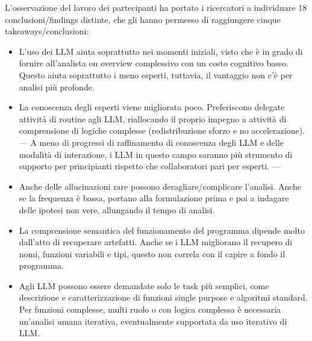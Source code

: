 L'osservazione del lavoro dei partecipanti ha portato i ricercatori a individuare 18 conclusioni/findings distinte, che gli hanno permesso di raggiungere cinque takeaways/conclusioni:

\begin{itemize}
    \item L'uso dei LLM aiuta soprattutto nei momenti iniziali, visto che è in grado di fornire all'analista on overview complessivo con un costo cognitivo basso. Questo aiuta soprattutto i meno esperti, tuttavia, il vantaggio non c'è per analisi più profonde.
    \item La conoscenza degli esperti viene migliorata poco. Preferiscono delegate attività di routine agli LLM, riallocando il proprio impegno a attività di comprensione di logiche complesse (redistribuzione sforzo e no accelerazione). --- A meno di progressi di raffinamento di conoscenza degli LLM e delle modalità di interazione, i LLM in questo campo saranno più strumento di supporto per principianti rispetto che collaboratori pari per esperti. ---
    \item Anche delle allucinazioni rare possono deragliare/complicare l'analisi. Anche se la frequenza è bassa, portano alla formulazione prima e poi a indagare delle ipotesi non vere, allungando il tempo di analisi.
    \item La comprensione semantica del funzionamento del programma dipende molto dall'atto di recuperare artefatti. Anche se i LLM migliorano il recupero di nomi, funzioni variabili e tipi, questo non correla con il capire a fondo il programma. 
    \item Agli LLM possono essere demandate solo le task più semplici, come descrizione e caratterizzazione di funzioni single purpose e algoritmi standard. Per funzioni complesse, multi ruolo o con logica complessa è necessaria un'analisi umana iterativa, eventualmente supportata da uso iterativo di LLM.
\end{itemize}


